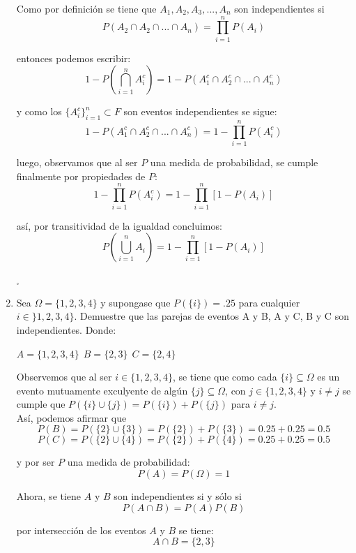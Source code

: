 \documentclass[12pt,a4paper]{report}
\begin{document}
\begin{enumerate}
{		Como por definición se tiene que $A_1, A_2, A_3, ..., A_n$ son independientes
		si
			$$ P(A_2 \cap A_2 \cap ... \cap A_n) = \prod_{i=1}^{n} P(A_i) $$

		entonces podemos escribir:
			$$ 1 - P\left(\bigcap_{i = 1}^n A_i^c\right) = 1 - P(A_1^c \cap A_2^c \cap ... \cap A_n^c) $$

		y como los $\lbrace A_{i}^c \rbrace _{i=1}^{n} \subset F$ son eventos independientes
		se sigue:
			$$ 1 - P(A_1^c \cap A_2^c \cap ... \cap A_n^c) = 1 - \prod_{i=1}^{n} P(A_i^c)$$

		luego, observamos que al ser $P$ una medida de probabilidad, se cumple
		finalmente por propiedades de $P$:
			$$ 1 - \prod_{i=1}^{n} P(A_i^c) = 1 - \prod_{i=1}^{n}[1 - P(A_i)] $$

		así, por transitividad de la igualdad concluimos:
			$$ P\left(\bigcup_{i=1}^n A_i \right) = 1 - \prod_{i=1}^{n}[1 - P(A_i)] $$
		\begin{flushright}
			$_{\square}$
		\end{flushright}
	}

   \item {
    Sea $\Omega = \lbrace 1,2,3,4 \rbrace$ y supongase que $P(\lbrace i \rbrace)=.25$ para cualquier $i\in \rbrace 1,2,3,4 \rbrace$. Demuestre que las parejas de eventos A y B, A y C, B y C son independientes. Donde:\\
    \begin{center}
    $A=\lbrace 1,2,3,4 \rbrace \ \ B=\lbrace 2,3 \rbrace \ \ C= \lbrace 2,4 \rbrace $
	\end{center}

		Observemos que al ser $i \in \{1,2,3,4\}$, se tiene que como cada $ \{i\} \subseteq \Omega$
		es un evento mutuamente exculyente de algún $\{ j \} \subseteq \Omega$, con
		$j \in \{1,2,3,4\}$ y $ i \neq j$ se cumple que $ P(\{i\} \cup \{j\}) = P(\{i\}) + P(\{j\}) $
		para $i \neq j$.\\

		Así, podemos afirmar que
			$$ P(B) = P(\{ 2 \} \cup \{ 3 \} ) = P(\{2\}) + P(\{3\}) = 0.25 + 0.25 = 0.5 $$
			$$ P(C) = P(\{ 2 \} \cup \{ 4 \} ) = P(\{2\}) + P(\{4\}) = 0.25 + 0.25 = 0.5 $$

		y por ser $P$ una medida de probabilidad:
			$$ P(A) = P(\Omega) = 1 $$

		Ahora, se tiene $A$ y $B$ son independientes si y sólo si
			$$ P(A \cap B) = P(A)P(B) $$

		por intersección de los eventos $A$ y $B$ se tiene:
			$$ A \cap B = \{ 2,3 \}$$

}
\end{enumerate}
\end{document}
